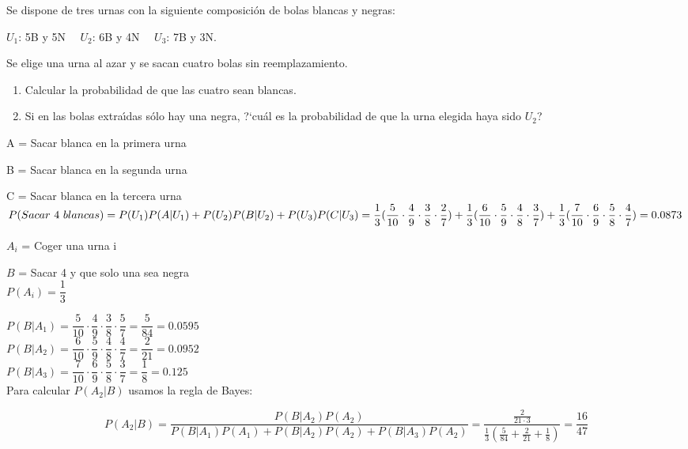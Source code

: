 \problem

Se dispone de tres  urnas con  la siguiente  composici{\'o}n de bolas blancas y negras:

\hskip 2cm $U_{1}$: 5B y 5N $\ \ \ $ $U_{2}$: 6B y 4N  $\ \ \ $
$U_{3}$: 7B y 3N.

Se elige  una urna al azar y se sacan  cuatro  bolas sin reemplazamiento.
\begin{enumerate}
	\item Calcular la probabilidad de que las cuatro sean blancas.
	\item Si en las  bolas extra{\'\i}das s{\'o}lo hay una negra, ?`cu{\'a}l es la probabilidad de que la urna elegida haya sido $U_{2}$?
\end{enumerate}

\subproblem
A = Sacar blanca en la primera urna

B = Sacar blanca en la segunda urna

C = Sacar blanca en la tercera urna \\


$P(Sacar\ 4 \ blancas) = P(U_1)P(A|U_1) + P(U_2)P(B|U_2) + P(U_3)P(C|U_3) =  \\
\dfrac{1}{3}(\dfrac{5}{10}\cdot\dfrac{4}{9}\cdot\dfrac{3}{8}\cdot\dfrac{2}{7}) + 
  \dfrac{1}{3}(\dfrac{6}{10}\cdot\dfrac{5}{9}\cdot\dfrac{4}{8}\cdot\dfrac{3}{7}) + 
  \dfrac{1}{3}(\dfrac{7}{10}\cdot\dfrac{6}{9}\cdot\dfrac{5}{8}\cdot\dfrac{4}{7}) = 0.0873$ \\

\subproblem

$A_i$ = Coger una urna i 

$B$ = Sacar 4 y que solo una sea negra \\

$P(A_i) = \dfrac{1}{3}$

$P(B|A_1) = \dfrac{5}{10} \cdot \dfrac{4}{9} \cdot \dfrac{3}{8} \cdot \dfrac{5}{7} = \dfrac{5}{84} = 0.0595$ \\

$P(B|A_2) = \dfrac{6}{10} \cdot \dfrac{5}{9} \cdot \dfrac{4}{8} \cdot \dfrac{4}{7} = \dfrac{2}{21} = 0.0952$ \\

$P(B|A_3) = \dfrac{7}{10} \cdot \dfrac{6}{9} \cdot \dfrac{5}{8} \cdot \dfrac{3}{7} = \dfrac{1}{8} = 0.125$ \\


Para calcular $P(A_2|B)$ usamos la regla de Bayes:

$$ P(A_2|B) = \dfrac{P(B|A_2)P(A_2)}{P(B|A_1)P(A_1)+P(B|A_2)P(A_2)+P(B|A_3)P(A_2)} = \dfrac{\frac{2}{21 \cdot 3}}{\frac{1}{3}(\frac{5}{84} + \frac{2}{21} + \frac{1}{8})} = \dfrac{16}{47}$$
